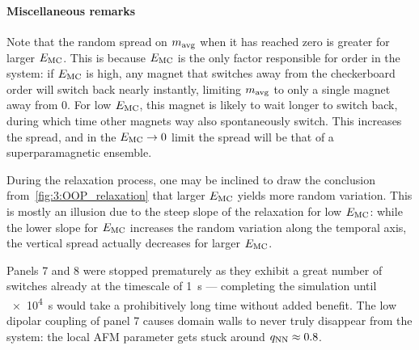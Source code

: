 \paragraph{Miscellaneous remarks}
Note that the random spread on $m_\mathrm{avg}$ when it has reached zero is greater for larger $E_\mathrm{MC}$.
This is because $E_\mathrm{MC}$ is the only factor responsible for order in the system: if $E_\mathrm{MC}$ is high, any magnet that switches away from the checkerboard order will switch back nearly instantly, limiting $m_\mathrm{avg}$ to only a single magnet away from 0.
For low $E_\mathrm{MC}$, this magnet is likely to wait longer to switch back, during which time other magnets way also spontaneously switch.
This increases the spread, and in the $E_\mathrm{MC} \rightarrow 0$ limit the spread will be that of a superparamagnetic ensemble. \par
During the relaxation process, one may be inclined to draw the conclusion from~\cref{fig:3:OOP_relaxation} that larger $E_\mathrm{MC}$ yields more random variation.
This is mostly an illusion due to the steep slope of the relaxation for low $E_\mathrm{MC}$: while the lower slope for $E_\mathrm{MC}$ increases the random variation along the temporal axis, the vertical spread actually decreases for larger $E_\mathrm{MC}$. \par
Panels 7 and 8 were stopped prematurely as they exhibit a great number of switches already at the timescale of \SI{1}{\second} --- completing the simulation until \SI{e4}{\second} would take a prohibitively long time without added benefit.
The low dipolar coupling of panel 7 causes domain walls to never truly disappear from the system: the local AFM parameter gets stuck around $q_\mathrm{NN} \approx 0.8$.

